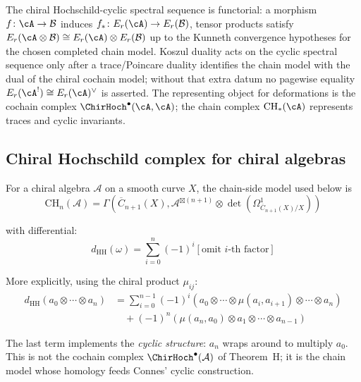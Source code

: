\begin{remark}[Functoriality]
The chiral Hochschild-cyclic spectral sequence is functorial: a morphism
$f\colon \cA \to \mathcal{B}$ induces $f_*\colon E_r(\cA) \to E_r(\mathcal{B})$,
tensor products satisfy $E_r(\cA \otimes \mathcal{B}) \cong E_r(\cA) \otimes E_r(\mathcal{B})$
up to the Kunneth convergence hypotheses for the chosen completed
chain model. Koszul duality acts on the cyclic spectral sequence only
after a trace/Poincare duality identifies the chain model with the
dual of the chiral cochain model; without that extra datum no
pagewise equality $E_r(\cA^!)\cong E_r(\cA)^\vee$ is asserted.
The representing object for deformations is the cochain complex
$\ChirHoch^\bullet(\cA,\cA)$; the chain complex
$\mathrm{CH}_*(\cA)$ represents traces and cyclic invariants.
\end{remark}

\subsection{Chiral Hochschild complex for chiral algebras}

\begin{definition}
\label{def:chiral-hochschild}
For a chiral algebra $\mathcal{A}$ on a smooth curve $X$, the
chain-side model used below is
\[\text{CH}_n(\mathcal{A}) = \Gamma\left(\overline{C}_{n+1}(X),
 \mathcal{A}^{\boxtimes(n+1)} \otimes \det\left(\Omega^1_{\overline{C}_{n+1}(X)/X}\right)\right)\]

with differential:
\[d_{\text{HH}}(\omega) = \sum_{i=0}^{n} (-1)^i \left[\text{omit } i\text{-th factor}\right]\]

More explicitly, using the chiral product $\mu_{ij}$:
\begin{align*}
d_{\text{HH}}(a_0 \otimes \cdots \otimes a_n)
&= \sum_{i=0}^{n-1} (-1)^i (a_0 \otimes \cdots \otimes \mu(a_i, a_{i+1})
 \otimes \cdots \otimes a_n) \\
&\quad + (-1)^n (\mu(a_n, a_0) \otimes a_1 \otimes \cdots \otimes a_{n-1})
\end{align*}

The last term implements the \emph{cyclic structure}: $a_n$ wraps around to multiply $a_0$.
This is not the cochain complex
$\ChirHoch^\bullet(\mathcal A)$ of Theorem~H; it is the chain model
whose homology feeds Connes' cyclic construction.
\end{definition}

